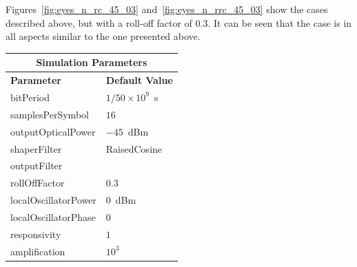 \begin{refsection}
Figures~\ref{fig:eyes_n_rc_45_03} and~\ref{fig:eyes_n_rrc_45_03} show the
cases described above, but with a roll-off factor of 0.3. It can be seen that
the case is in all aspects similar to the one presented above.

\begin{table}[H]
	\centering
	\footnotesize
	\begin{tabular}{|l|l|}
		\hline
		\multicolumn{2}{|c|}{ \textbf{Simulation Parameters} } \\
		\hline
		\textbf{Parameter}     & \textbf{Default Value}                                     \\\hline
		bitPeriod              & $1/50\times10^9$~s														\\\hline
		samplesPerSymbol       & $16$                                                       \\\hline
		outputOpticalPower     & $-45$~dBm 													\\ \hline
		shaperFilter	       & RaisedCosine												\\ \hline
		outputFilter		   &                     										\\ \hline
		rollOffFactor		   & 0.3														\\ \hline
		localOscillatorPower   & $0$~dBm                                                    \\ \hline
		localOscillatorPhase   & $0$                                                        \\ \hline
		responsivity           & $1$                                                        \\ \hline
		amplification          & $10^3$                                                     \\ \hline

\end{tabular}
\end{table}
\end{refsection}
